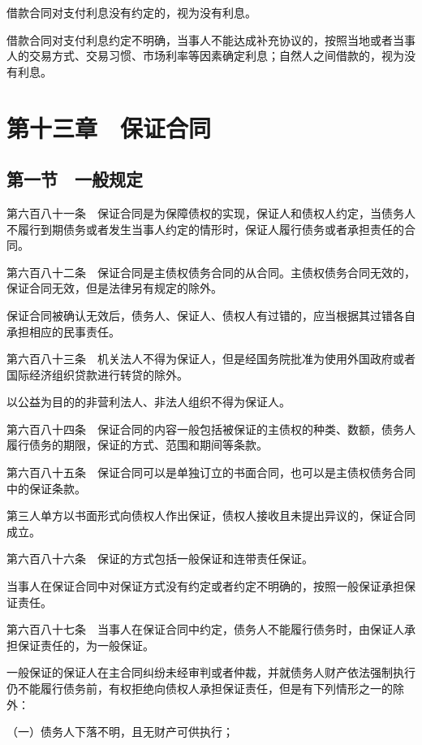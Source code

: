 \documentclass[UTF8,12pt,a4paper]{ctexbook}
\begin{document}
借款合同对支付利息没有约定的，视为没有利息。

借款合同对支付利息约定不明确，当事人不能达成补充协议的，按照当地或者当事人的交易方式、交易习惯、市场利率等因素确定利息；自然人之间借款的，视为没有利息。

\section*{第十三章　保证合同}

\subsection*{第一节　一般规定}

第六百八十一条　保证合同是为保障债权的实现，保证人和债权人约定，当债务人不履行到期债务或者发生当事人约定的情形时，保证人履行债务或者承担责任的合同。

第六百八十二条　保证合同是主债权债务合同的从合同。主债权债务合同无效的，保证合同无效，但是法律另有规定的除外。

保证合同被确认无效后，债务人、保证人、债权人有过错的，应当根据其过错各自承担相应的民事责任。

第六百八十三条　机关法人不得为保证人，但是经国务院批准为使用外国政府或者国际经济组织贷款进行转贷的除外。

以公益为目的的非营利法人、非法人组织不得为保证人。

第六百八十四条　保证合同的内容一般包括被保证的主债权的种类、数额，债务人履行债务的期限，保证的方式、范围和期间等条款。

第六百八十五条　保证合同可以是单独订立的书面合同，也可以是主债权债务合同中的保证条款。

第三人单方以书面形式向债权人作出保证，债权人接收且未提出异议的，保证合同成立。

第六百八十六条　保证的方式包括一般保证和连带责任保证。

当事人在保证合同中对保证方式没有约定或者约定不明确的，按照一般保证承担保证责任。

第六百八十七条　当事人在保证合同中约定，债务人不能履行债务时，由保证人承担保证责任的，为一般保证。

一般保证的保证人在主合同纠纷未经审判或者仲裁，并就债务人财产依法强制执行仍不能履行债务前，有权拒绝向债权人承担保证责任，但是有下列情形之一的除外：

（一）债务人下落不明，且无财产可供执行；
\end{document}
